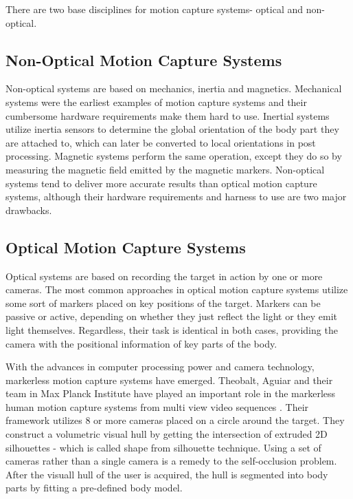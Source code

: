  There are two base disciplines for motion capture systems- optical and non-optical.
 
\subsection{Non-Optical Motion Capture Systems}
 
 Non-optical systems are based on mechanics, inertia\cite{Miller2004} and magnetics\cite{Yabukami2000}. Mechanical systems were the earliest examples of motion capture systems and 
 their cumbersome hardware requirements make them hard to use. Inertial systems utilize inertia sensors to determine the global orientation of the body part they 
 are attached to, which can later be converted to local orientations in post processing. Magnetic systems perform the same operation, except they do so by measuring 
 the magnetic field emitted by the magnetic markers. Non-optical systems tend to deliver more accurate results than optical motion capture systems, although 
 their hardware requirements and harness to use are two major drawbacks. 
 
\subsection{Optical Motion Capture Systems}

 Optical systems are based on recording the target in action by one or more 
 cameras. The most common approaches in optical motion capture systems utilize some sort of markers placed on key positions of the target. Markers can be passive
 \cite{Sementille2004} or active\cite{Maletsky2007}, depending on whether they just reflect the light or they emit light themselves. Regardless, their task is 
 identical in both cases, providing the camera with the positional information of key parts of the body. 
 
 With the advances in computer processing power and camera technology, markerless motion capture systems have emerged\cite{Cheung2003}. Theobalt, Aguiar and their team in Max 
 Planck Institute have played an important role in the markerless human motion capture systems from multi view video sequences \cite{Aguiar2007,Gall2009,Liu2011}. Their framework
 utilizes 8 or more cameras placed on a circle around the target. They construct a volumetric visual hull by getting the intersection of extruded 2D silhouettes 
 - which is called shape from silhouette technique\cite{Cheung2000,Cheung2005}. Using a set of cameras rather than a single camera is a remedy to the self-occlusion
 problem. After the visuall hull of the user is acquired, the hull is segmented into body parts by fitting a pre-defined body model.   
 
   